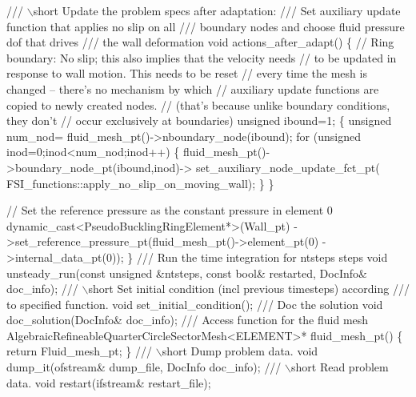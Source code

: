 \begin{DoxyCodeInclude}
\textcolor{comment}{}
\textcolor{comment}{ /// \(\backslash\)short Update the problem specs after adaptation:}
\textcolor{comment}{ /// Set auxiliary update function that applies no slip on all }
\textcolor{comment}{ /// boundary nodes and choose fluid pressure dof that drives}
\textcolor{comment}{ /// the wall deformation}
\textcolor{comment}{} \textcolor{keywordtype}{void} actions\_after\_adapt() 
  \{
   \textcolor{comment}{// Ring boundary: No slip; this also implies that the velocity needs}
   \textcolor{comment}{// to be updated in response to wall motion. This needs to be reset}
   \textcolor{comment}{// every time the mesh is changed -- there's no mechanism by which}
   \textcolor{comment}{// auxiliary update functions are copied to newly created nodes.}
   \textcolor{comment}{// (that's because unlike boundary conditions, they don't }
   \textcolor{comment}{// occur exclusively at boundaries)}
   \textcolor{keywordtype}{unsigned} ibound=1;
   \{
    \textcolor{keywordtype}{unsigned} num\_nod= fluid\_mesh\_pt()->nboundary\_node(ibound);
    \textcolor{keywordflow}{for} (\textcolor{keywordtype}{unsigned} inod=0;inod<num\_nod;inod++)
     \{
      fluid\_mesh\_pt()->boundary\_node\_pt(ibound,inod)->
       set\_auxiliary\_node\_update\_fct\_pt(
        FSI\_functions::apply\_no\_slip\_on\_moving\_wall); 
     \}
   \}
   
   \textcolor{comment}{// Set the reference pressure as the constant pressure in element 0}
   \textcolor{keyword}{dynamic\_cast<}PseudoBucklingRingElement*\textcolor{keyword}{>}(Wall\_pt)
    ->set\_reference\_pressure\_pt(fluid\_mesh\_pt()->element\_pt(0)
                                ->internal\_data\_pt(0));
  \}
   \textcolor{comment}{}
\textcolor{comment}{ /// Run the time integration for ntsteps steps}
\textcolor{comment}{} \textcolor{keywordtype}{void} unsteady\_run(\textcolor{keyword}{const} \textcolor{keywordtype}{unsigned} &ntsteps, \textcolor{keyword}{const} \textcolor{keywordtype}{bool}& restarted,
                   DocInfo& doc\_info);
\textcolor{comment}{}
\textcolor{comment}{ /// \(\backslash\)short Set initial condition (incl previous timesteps) according}
\textcolor{comment}{ /// to specified function. }
\textcolor{comment}{} \textcolor{keywordtype}{void} set\_initial\_condition();
 \textcolor{comment}{}
\textcolor{comment}{ /// Doc the solution}
\textcolor{comment}{} \textcolor{keywordtype}{void} doc\_solution(DocInfo& doc\_info);
\textcolor{comment}{}
\textcolor{comment}{ /// Access function for the fluid mesh}
\textcolor{comment}{} AlgebraicRefineableQuarterCircleSectorMesh<ELEMENT>* fluid\_mesh\_pt()
  \{
   \textcolor{keywordflow}{return} Fluid\_mesh\_pt; 
  \}
 \textcolor{comment}{}
\textcolor{comment}{ /// \(\backslash\)short Dump problem data.}
\textcolor{comment}{} \textcolor{keywordtype}{void} dump\_it(ofstream& dump\_file, DocInfo doc\_info);
\textcolor{comment}{}
\textcolor{comment}{ /// \(\backslash\)short Read problem data.}
\textcolor{comment}{} \textcolor{keywordtype}{void} restart(ifstream& restart\_file);


\end{DoxyCodeInclude}
